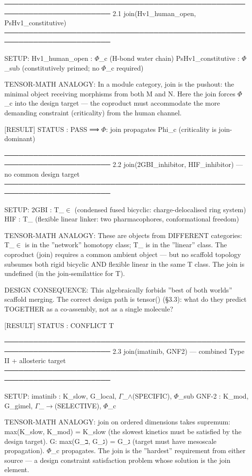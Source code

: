 \documentclass[12pt,a4paper]{article}
\begin{document}
────────────────────────────────────────────────────────────────────────
2.1  join(Hv1\_human\_open, PsHv1\_constitutive)
────────────────────────────────────────────────────────────────────────

SETUP:
Hv1\_human\_open      : $\Phi$\_c  (H-bond water chain)
PsHv1\_constitutive  : $\Phi$\_sub (constitutively primed; no $\Phi$\_c required)

TENSOR-MATH ANALOGY:
In a module category, join is the pushout: the minimal object
receiving morphisms from both M and N. Here the join forces $\Phi$\_c
into the design target --- the coproduct must accommodate the more
demanding constraint (criticality) from the human channel.

{[}RESULT{]}
STATUS  : PASS
⟹  $\Phi$: join propagates Phi\_c (criticality is join-dominant)

────────────────────────────────────────────────────────────────────────
2.2  join(2GBI\_inhibitor, HIF\_inhibitor) --- no common design target
────────────────────────────────────────────────────────────────────────

SETUP:
2GBI : T\_$\in$  (condensed fused bicyclic: charge-delocalised ring system)
HIF  : T\_\textbar{}  (flexible linear linker: two pharmacophores, conformational freedom)

TENSOR-MATH ANALOGY:
These are objects from DIFFERENT categories: T\_$\in$ is in the ''network''
homotopy class; T\_\textbar{} is in the ''linear'' class. The coproduct (join)
requires a common ambient object --- but no scaffold topology subsumes
both rigid bicyclic AND flexible linear in the same T class.
The join is undefined (\perp in the join-semilattice for T).

DESIGN CONSEQUENCE:
This algebraically forbids ''best of both worlds'' scaffold merging.
The correct design path is tensor() (§3.3): what do they predict
TOGETHER as a co-assembly, not as a single molecule?

{[}RESULT{]}
STATUS  : CONFLICT
  T

────────────────────────────────────────────────────────────────────────
2.3  join(imatinib, GNF2) --- combined Type II + allosteric target
────────────────────────────────────────────────────────────────────────

SETUP:
imatinib  : K\_slow, G\_local,  $\Gamma$\_$\land$(SPECIFIC), $\Phi$\_sub
GNF-2     : K\_mod,  G\_gimel,  $\Gamma$\_$\rightarrow$(SELECTIVE), $\Phi$\_c

TENSOR-MATH ANALOGY:
join on ordered dimensions takes supremum: max(K\_slow, K\_mod) = K\_slow
(the slowest kinetics must be satisfied by the design target).
G: max(G\_ב, G\_ג) = G\_ג (target must have mesoscale propagation).
$\Phi$\_c propagates. The join is the ''hardest'' requirement from either
source --- a design constraint satisfaction problem whose solution
is the join element.
\end{document}
